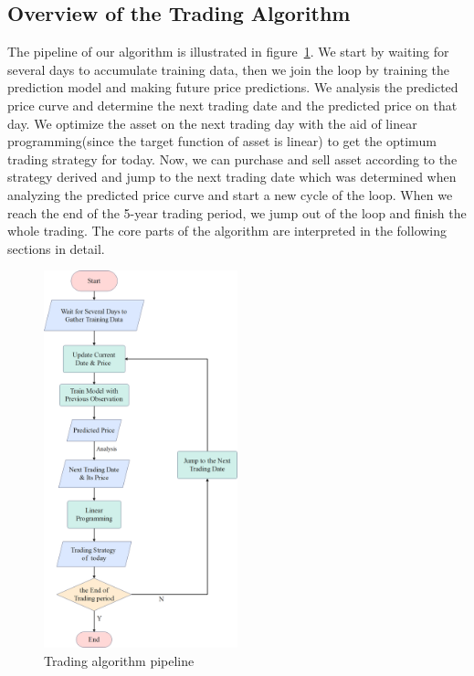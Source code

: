\documentclass{mcmthesis}
\begin{document}
\subsection{Overview of the Trading Algorithm}
The pipeline of our algorithm is illustrated in figure~\ref{fig:trading algorithm pipeline}. We start by waiting for several days to accumulate training data, then we join the loop by training the prediction model and making future price predictions. We analysis the predicted price curve and determine the next trading date and the predicted price on that day. We optimize the asset on the next trading day with the aid of linear programming(since the target function of asset is linear) to get the optimum trading strategy for today. Now, we can purchase and sell asset according to the strategy derived and jump to the next trading date which was determined when analyzing the predicted price curve and start a new cycle of the loop. When we reach the end of the 5-year trading period, we jump out of the loop and finish the whole trading. The core parts of the algorithm are interpreted in the following sections in detail.

\begin{figure}[htb]
    \centering
    \includegraphics[width = 0.5\textwidth]{fig/trading algorithm pipeline.png}
    \caption{Trading algorithm pipeline}
    \label{fig:trading algorithm pipeline}
\end{figure}
\end{document}
